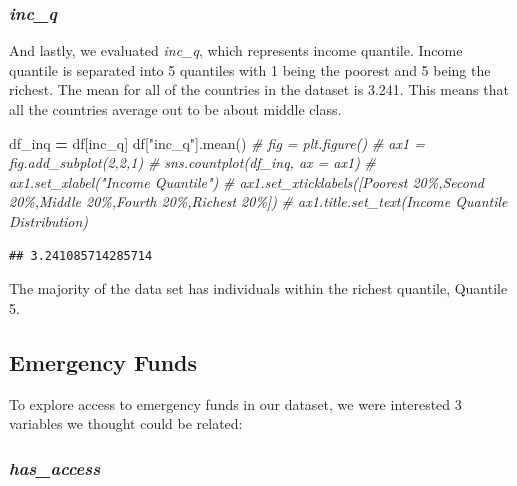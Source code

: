 \documentclass[water,article,submit,moreauthors,pdftex]{mdpi}
\newenvironment{Shaded}{\begin{snugshade}}{\end{snugshade}}
\newcommand{\CommentTok}[1]{\textcolor[rgb]{0.56,0.35,0.01}{\textit{#1}}}
\newcommand{\NormalTok}[1]{#1}
\newcommand{\OperatorTok}[1]{\textcolor[rgb]{0.81,0.36,0.00}{\textbf{#1}}}
\newcommand{\StringTok}[1]{\textcolor[rgb]{0.31,0.60,0.02}{#1}}
\begin{document}
\hypertarget{inc_q}{%
\subsubsection{\texorpdfstring{\emph{inc\_q}}{inc\_q}}\label{inc_q}}

And lastly, we evaluated \emph{inc\_q}, which represents income
quantile. Income quantile is separated into 5 quantiles with 1 being the
poorest and 5 being the richest. The mean for all of the countries in
the dataset is 3.241. This means that all the countries average out to
be about middle class.

\begin{Shaded}
\begin{Highlighting}[]
\NormalTok{df\_inq }\OperatorTok{=}\NormalTok{ df[}\StringTok{\textquotesingle{}inc\_q\textquotesingle{}}\NormalTok{]}
\NormalTok{df[}\StringTok{"inc\_q"}\NormalTok{].mean()}
\CommentTok{\# fig = plt.figure()}
\CommentTok{\# ax1 = fig.add\_subplot(2,2,1) }
\CommentTok{\# sns.countplot(df\_inq, ax = ax1)}
\CommentTok{\# ax1.set\_xlabel("Income Quantile")}
\CommentTok{\# ax1.set\_xticklabels([\textquotesingle{}Poorest 20\%\textquotesingle{},\textquotesingle{}Second 20\%\textquotesingle{},\textquotesingle{}Middle 20\%\textquotesingle{},\textquotesingle{}Fourth 20\%\textquotesingle{},\textquotesingle{}Richest 20\%\textquotesingle{}])}
\CommentTok{\# ax1.title.set\_text(\textquotesingle{}Income Quantile  Distribution\textquotesingle{})}
\end{Highlighting}
\end{Shaded}

\begin{verbatim}
## 3.241085714285714
\end{verbatim}

The majority of the data set has individuals within the richest
quantile, Quantile 5.

\hypertarget{emergency-funds}{%
\subsection{Emergency Funds}\label{emergency-funds}}

To explore access to emergency funds in our dataset, we were interested
3 variables we thought could be related:

\hypertarget{has_access}{%
\subsubsection{\texorpdfstring{\emph{has\_access}}{has\_access}}\label{has_access}}
\end{document}
